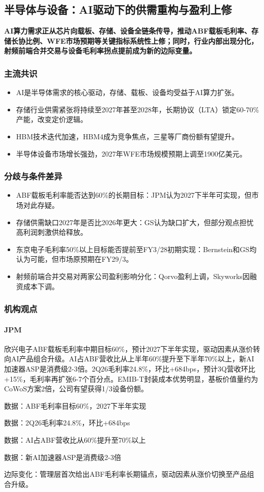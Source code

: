 \documentclass[11pt]{ctexart}
\begin{document}
\subsection{半导体与设备：AI驱动下的供需重构与盈利上修}
\textbf{AI算力需求正从芯片向载板、存储、设备全链条传导，推动ABF载板毛利率、存储长协比例、WFE市场预期等关键指标系统性上修；同时，行业内部出现分化，射频前端合并交易与设备毛利率拐点提前成为新的边际变量。}
\subsubsection*{主流共识}
\begin{itemize}
  \item AI是半导体需求的核心驱动，存储、载板、设备均受益于AI算力扩张。
  \item 存储行业供需紧张将持续至2027年甚至2028年，长期协议（LTA）锁定60-70\%产能，改变定价逻辑。
  \item HBM技术迭代加速，HBM4成为竞争焦点，三星等厂商份额有望提升。
  \item 半导体设备市场增长强劲，2027年WFE市场规模预期上调至1900亿美元。
\end{itemize}
\subsubsection*{分歧与条件差异}
\begin{itemize}
  \item ABF载板毛利率能否达到60\%的长期目标：JPM认为2027下半年可实现，但市场对此存疑。
  \item 存储供需缺口2027年是否比2026年更大：GS认为缺口扩大，但部分观点担忧高利润刺激供给释放。
  \item 东京电子毛利率50\%以上目标能否提前至FY3/28初期实现：Bernstein和GS均认为可能，但市场原预期在FY29/3。
  \item 射频前端合并交易对两家公司盈利影响分化：Qorvo盈利上调，Skyworks因融资成本下调。
\end{itemize}
\subsubsection*{机构观点}
\paragraph{JPM} 欣兴电子ABF载板毛利率中期目标60\%，预计2027下半年实现，驱动因素从涨价转向AI产品组合升级。AI占ABF营收比从上半年60\%提升至下半年70\%以上，新AI加速器ASP是消费级2-3倍。2Q26毛利率24.8\%，环比+684bps，预计3Q营收环比+15\%，毛利率再扩张6-7个百分点。EMIB-T封装成本优势明显，基板价值量约为CoWoS方案2倍，公司有望获得1/3设备份额。
{\small\color{refgray}数据：ABF毛利率目标60\%，2027下半年实现\par}
{\small\color{refgray}数据：2Q26毛利率24.8\%，环比+684bps\par}
{\small\color{refgray}数据：AI占ABF营收比从60\%提升至70\%以上\par}
{\small\color{refgray}数据：新AI加速器ASP是消费级2-3倍\par}
{\small\color{refgray}边际变化：管理层首次给出ABF毛利率长期锚点，驱动因素从涨价切换至产品组合升级。\par}
\end{document}
